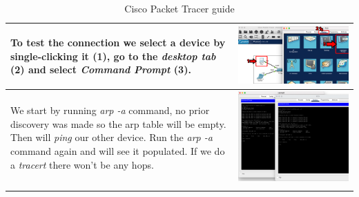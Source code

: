 \documentclass[11pt,a4paper]{report}
\begin{document}
\begin{flushleft}
\begin{center}
\begin{longtable}{ m{5cm} l }
                        To test the connection we select a device by \textbf{single-clicking} it (1), go to the \textit{desktop tab} (2) and select \textit{Command Prompt} (3).                                                                                                                    & \includegraphics[scale=0.35,valign=c]{phase2/images/p1-connectingdevices/CiscoPacketTracer_cmdOutput} \\ \hline
                        We start by running \textit{arp -a} command, no prior discovery was made so the arp table will be empty. Then will \textit{ping} our other device. Run the \textit{arp -a} command again and will see it populated. If we do a \textit{tracert} there won't be any hops.    & \includegraphics[scale=0.34,valign=c]{phase2/images/p1-connectingdevices/Laptop0PC0_cmd} \\ \hline

                        \caption{Cisco Packet Tracer guide} \label{tab:cptg}
                    \end{longtable}
                \end{center}
        \end{flushleft}
\end{document}
